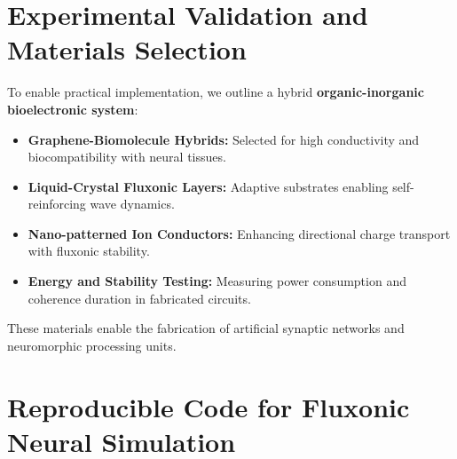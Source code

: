 \documentclass{article}
\begin{document}
\section{Experimental Validation and Materials Selection}
To enable practical implementation, we outline a hybrid \textbf{organic-inorganic bioelectronic system}:
\begin{itemize}
    \item \textbf{Graphene-Biomolecule Hybrids:} Selected for high conductivity and biocompatibility with neural tissues.
    \item \textbf{Liquid-Crystal Fluxonic Layers:} Adaptive substrates enabling self-reinforcing wave dynamics.
    \item \textbf{Nano-patterned Ion Conductors:} Enhancing directional charge transport with fluxonic stability.
    \item \textbf{Energy and Stability Testing:} Measuring power consumption and coherence duration in fabricated circuits.
\end{itemize}
These materials enable the fabrication of artificial synaptic networks and neuromorphic processing units.

\section{Reproducible Code for Fluxonic Neural Simulation}
\end{document}
